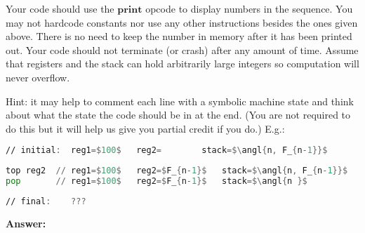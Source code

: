 \documentclass[11pt]{article}
\newcommand{\kw}[1]{\ensuremath{\mathbf{#1}}}
\DeclarePairedDelimiter\angl{\langle}{\rangle}
\begin{document}
\begin{enumerate}
Your code should use the \kw{print} opcode to display numbers in the sequence. You may not hardcode constants nor use any other instructions besides the ones given above. There is no need to keep the number in memory after it has been printed out.  Your code should not terminate (or crash) after any amount of time.  Assume that registers and the stack can hold arbitrarily large integers so computation will never overflow.

Hint: it may help to comment each line with a symbolic machine state and think about what the state the code should be in at the end.
(You are not required to do this but it will help us give you partial credit if you do.)
E.g.:

\begin{lstlisting}[language=asm, mathescape, numbers=none]
// initial:  reg1=$100$   reg2=        stack=$\angl{n, F_{n-1}}$
\end{lstlisting}
\begin{lstlisting}[language=asm, mathescape, firstnumber=100]
top reg2  // reg1=$100$   reg2=$F_{n-1}$   stack=$\angl{n, F_{n-1}}$
pop       // reg1=$100$   reg2=$F_{n-1}$   stack=$\angl{n }$
\end{lstlisting}
\begin{lstlisting}[language=asm, mathescape, numbers=none]
// final:    ???
\end{lstlisting}

\newpage

\textbf{Answer:}


\end{enumerate}
\end{document}
